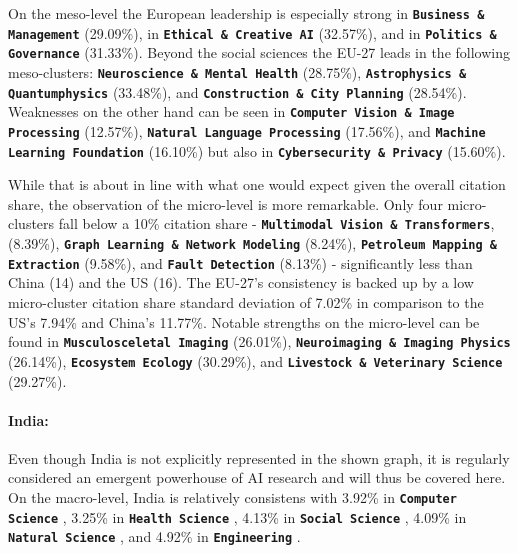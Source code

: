 \documentclass{article}
\begin{document}
	On the meso-level the European leadership is especially strong in \textbf{\texttt{Business \& Management}}  (29.09\%), in \textbf{\texttt{Ethical \& Creative AI}}  (32.57\%), and in \textbf{\texttt{Politics \& Governance}}  (31.33\%). Beyond the social sciences the EU-27 leads in the following meso-clusters: \textbf{\texttt{Neuroscience \& Mental Health}}  (28.75\%), \textbf{\texttt{Astrophysics \& Quantumphysics}}  (33.48\%), and \textbf{\texttt{Construction \& City Planning}}  (28.54\%). Weaknesses on the other hand can be seen in \textbf{\texttt{Computer Vision \& Image Processing}}  (12.57\%), \textbf{\texttt{Natural Language Processing}}  (17.56\%), and \textbf{\texttt{Machine Learning Foundation}}  (16.10\%) but also in \textbf{\texttt{Cybersecurity \& Privacy}}  (15.60\%).
	
	While that is about in line with what one would expect given the overall citation share, the observation of the micro-level is more remarkable. Only four micro-clusters fall below a 10\% citation share - \textbf{\texttt{Multimodal Vision \& Transformers}},  (8.39\%), \textbf{\texttt{Graph Learning \& Network Modeling}}  (8.24\%), \textbf{\texttt{Petroleum Mapping \& Extraction}}  (9.58\%), and \textbf{\texttt{Fault Detection}}  (8.13\%) - significantly less than China (14) and the US (16). The EU-27's consistency is backed up by a low micro-cluster citation share standard deviation of 7.02\% in comparison to the US's 7.94\% and China's 11.77\%. Notable strengths on the micro-level can be found in \textbf{\texttt{Musculosceletal Imaging}}  (26.01\%), \textbf{\texttt{Neuroimaging \& Imaging Physics}}  (26.14\%), \textbf{\texttt{Ecosystem Ecology}}  (30.29\%), and \textbf{\texttt{Livestock \& Veterinary Science}}  (29.27\%).
	
	\paragraph{India:} Even though India is not explicitly represented in the shown graph, it is regularly considered an emergent powerhouse of AI research and will thus be covered here. On the macro-level, India is relatively consistens with 3.92\% in \textbf{\texttt{Computer Science}} , 3.25\% in \textbf{\texttt{Health Science}} , 4.13\% in \textbf{\texttt{Social Science}} , 4.09\% in \textbf{\texttt{Natural Science}} , and 4.92\% in \textbf{\texttt{Engineering}} .
	
\end{document}
